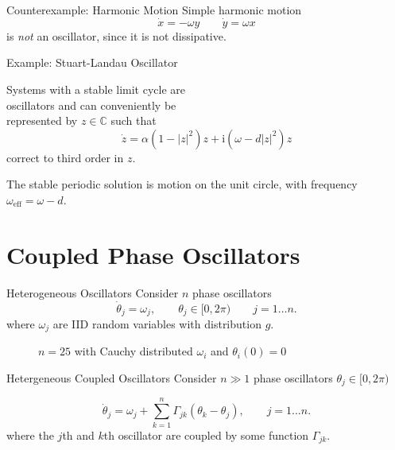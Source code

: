 \documentclass[11pt,reqno]{beamer}
\newcommand{\I}{\mathrm{i}}
\begin{document}
\begin{frame}{Counterexample: Harmonic Motion}
Simple harmonic motion
\[
\dot{x}= -\omega y \qquad \dot{y} = \omega x
\]
 is \emph{not} an oscillator, since it is not dissipative.
\end{frame}
\begin{frame}{Example: Stuart-Landau Oscillator}
\begin{minipage}{0.65\textwidth}
Systems with a stable limit cycle are\\ oscillators and can conveniently be\\ represented by $z \in \mathbb{C}$ such that
\[
\dot{z} = \alpha(1-|z|^2)z + \I(\omega -d|z|^2)z
\]
correct to third order in $z$.
\end{minipage}
\begin{minipage}{0.3\textwidth}
\end{minipage}
\vfill

The stable periodic solution is motion on the unit circle, with frequency $\omega_\text{eff} = \omega - d$.
\end{frame}
\section{Coupled Phase Oscillators}
\begin{frame}{Heterogeneous Oscillators}
Consider $n$ phase oscillators
\[
\dot{\theta}_j = \omega_j, \qquad \theta_j \in [0,2\pi)\qquad j = 1 \ldots n.
\]
where $\omega_j$ are IID random variables with distribution $g$.
\begin{figure}
\caption{$n=25$ with Cauchy distributed $\omega_i$ and $\theta_i(0) = 0$}
\end{figure}
\end{frame}
\begin{frame}{Hetergeneous Coupled Oscillators}
Consider $n\gg1$ phase oscillators $\theta_j \in [0,2\pi)$

\[
\dot{\theta}_j = \omega_j + \sum_{k=1}^n\Gamma_{jk}(\theta_k - \theta_j) , \qquad j = 1 \ldots n.
\]
where the $j$th and $k$th oscillator are coupled by some function $\Gamma_{jk}$.
\vfill
{}
\end{frame}
\end{document}
